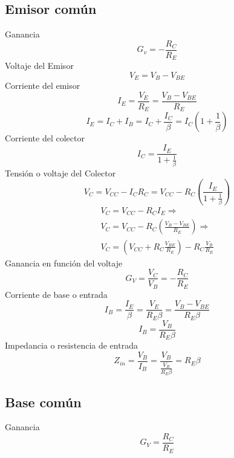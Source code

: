 \documentclass[12pt,spanish,lettersize,twocolumn]{article}
\begin{document}
\subsection{Emisor com\'un}
Ganancia
\begin{equation*}
G_v=-\frac{R_C}{R_E}
\end{equation*}
Voltaje del Emisor
\begin{equation*}
V_E=V_B-V_{BE}
\end{equation*}
Corriente del emisor
\begin{equation*}
I_E=\frac{V_E}{R_E}=\frac{V_B-V_{BE}}{R_E}
\end{equation*}
\begin{equation*}
I_E=I_C+I_B = I_C+\frac{I_C}{\beta}=I_C\left(1+\frac{1}{\beta}\right)
\end{equation*}
Corriente del colector
\begin{equation*}
I_C=\frac{I_E}{1+\frac{1}{\beta}}
\end{equation*}
Tensi\'on o voltaje del Colector
\begin{equation*}
V_C=V_{CC}-I_CR_C=V_{CC}-R_C\left(\frac{I_E}{1+\frac{1}{\beta}}\right)
\end{equation*}
\begin{eqnarray}
\nonumber V_C=V_{CC}-R_CI_E\Rightarrow\\
\nonumber V_C=V_{CC}-R_C\left(\frac{V_B-V_{BE}}{R_E}\right)\Rightarrow\\
\nonumber V_C=\left(V_{CC}+R_C\frac{V_{BE}}{R_{E}}\right)-R_C\frac{V_B}{R_E}
\end{eqnarray}
Ganancia en funci\'on del voltaje
\begin{equation*}
G_V=\frac{V_C}{V_B}=-\frac{R_C}{R_E}
\end{equation*}
Corriente de base o entrada
\begin{equation*}
I_B=\frac{I_E}{\beta}=\frac{V_E}{R_E\beta}=\frac{V_B-V_{BE}}{R_E\beta}
\end{equation*}
\begin{equation*}
I_B=\frac{V_B}{R_E\beta}
\end{equation*}
Impedancia o resistencia de entrada
\begin{equation*}
Z_{in}=\frac{V_B}{I_B}=\frac{V_B}{\frac{V_B}{R_E\beta}}=R_E\beta
\end{equation*}

\subsection{Base com\'un}
Ganancia
\begin{equation*}
G_V=\frac{R_C}{R_E}
\end{equation*}
\end{document}
